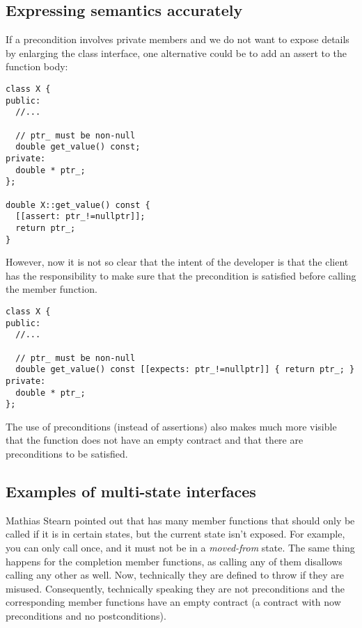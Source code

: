 \subsection{Expressing semantics accurately}

If a precondition involves private members and we do not want to expose details
by enlarging the class interface, one alternative could be to add an assert to
the function body:

\begin{lstlisting}
class X {
public:
  //...

  // ptr_ must be non-null
  double get_value() const;
private:
  double * ptr_;
};

double X::get_value() const {
  [[assert: ptr_!=nullptr]];
  return ptr_;
}
\end{lstlisting}

However, now it is not so clear that the intent of the developer is that the
client has the responsibility to make sure that the precondition is satisfied
before calling the member function.

\begin{lstlisting}
class X {
public:
  //...

  // ptr_ must be non-null
  double get_value() const [[expects: ptr_!=nullptr]] { return ptr_; }
private:
  double * ptr_;
};
\end{lstlisting}

The use of preconditions (instead of assertions) also makes much more visible
that the function does not have an empty contract and that there are
preconditions to be satisfied.

\subsection{Examples of multi-state interfaces}

Mathias Stearn pointed out that
 has many member functions that should only be called if it
is in certain states, but the current state isn’t exposed. For example, you can
only call  once, and it must not be in a \emph{moved-from}
state. The same thing happens for the completion member functions, as calling any of
them disallows calling any other as well. Now, technically they are defined to
throw if they are misused. Consequently, technically speaking they are not
preconditions and the corresponding member functions have an empty contract (a
contract with now preconditions and no postconditions). 


